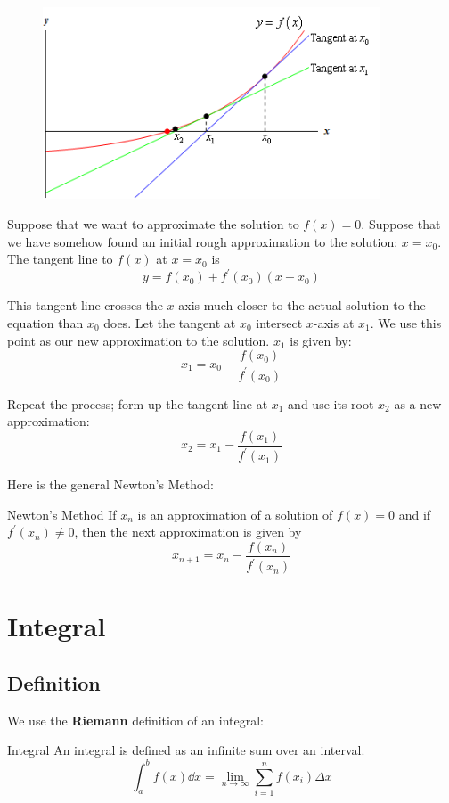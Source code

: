 \begin{figure}[H]
    \centering
    \includegraphics[width=10cm]{images/newton_method.png}
\end{figure}

Suppose that we want to approximate the solution to $f(x)=0$. Suppose that we have somehow found an initial rough approximation to the solution: $x=x_0$. The tangent line to $f(x)$ at $x=x_0$ is
\[ y = f(x_0) + f^\prime(x_0)(x-x_0) \]

This tangent line crosses the $x$-axis much closer to the actual solution to the equation than $x_0$ does. Let the tangent at $x_0$ intersect $x$-axis at $x_1$. We use this point as our new approximation to the solution. $x_1$ is given by:
\[ x_1 = x_0 - \frac{f(x_0)}{f^\prime(x_0)} \]

Repeat the process; form up the tangent line at $x_1$ and use its root $x_2$ as a new approximation:
\[ x_2 = x_1 - \frac{f(x_1)}{f^\prime(x_1)} \]

Here is the general Newton's Method:
\begin{thrm}{Newton's Method}{}
If $x_n$ is an approximation of a solution of $f(x)=0$ and if $f^\prime(x_n) \neq 0$, then the next approximation is given by
\[ x_{n+1} = x_n - \frac{f(x_n)}{f^\prime(x_n)} \]
\end{thrm}
\pagebreak

\section{Integral}
\subsection{Definition}
We use the \textbf{Riemann} definition of an integral:
\begin{defn}{Integral}{}
An integral is defined as an infinite sum over an interval.
\begin{equation}
\int_a^b f(x) \dd{x} = \lim_{n \to \infty} \sum_{i=1}^n f(x_i) \Delta x
\end{equation}
\end{defn}

